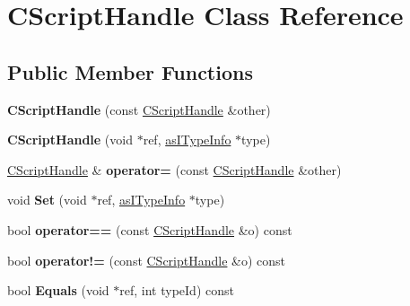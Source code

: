 \hypertarget{class_c_script_handle}{}\section{C\+Script\+Handle Class Reference}
\label{class_c_script_handle}
\subsection*{Public Member Functions}
\begin{DoxyCompactItemize}
\item 
\mbox{\label{class_c_script_handle_a4d68105d3c549d3624305ace595a68bb}} 
{\bfseries C\+Script\+Handle} (const \hyperlink{class_c_script_handle}{C\+Script\+Handle} \&other)
\item 
\mbox{\label{class_c_script_handle_a5b1d6da74fceee0b6dc85a912dc777af}} 
{\bfseries C\+Script\+Handle} (void $\ast$ref, \hyperlink{classas_i_type_info}{as\+I\+Type\+Info} $\ast$type)
\item 
\mbox{\label{class_c_script_handle_ab0defc7df0816262bee364b85afeb630}} 
\hyperlink{class_c_script_handle}{C\+Script\+Handle} \& {\bfseries operator=} (const \hyperlink{class_c_script_handle}{C\+Script\+Handle} \&other)
\item 
\mbox{\label{class_c_script_handle_a267343c8ec222b714de6deb47a2d39e7}} 
void {\bfseries Set} (void $\ast$ref, \hyperlink{classas_i_type_info}{as\+I\+Type\+Info} $\ast$type)
\item 
\mbox{\label{class_c_script_handle_aad57127ae09cb3a8b1be8338c6fff921}} 
bool {\bfseries operator==} (const \hyperlink{class_c_script_handle}{C\+Script\+Handle} \&o) const
\item 
\mbox{\label{class_c_script_handle_a30fac50a9d6c638e9ef4da7802b11146}} 
bool {\bfseries operator!=} (const \hyperlink{class_c_script_handle}{C\+Script\+Handle} \&o) const
\item 
\mbox{\label{class_c_script_handle_a3751c165f56d4ddb64fc6f3bb19aec6d}} 
bool {\bfseries Equals} (void $\ast$ref, int type\+Id) const

\end{DoxyCompactItemize}
